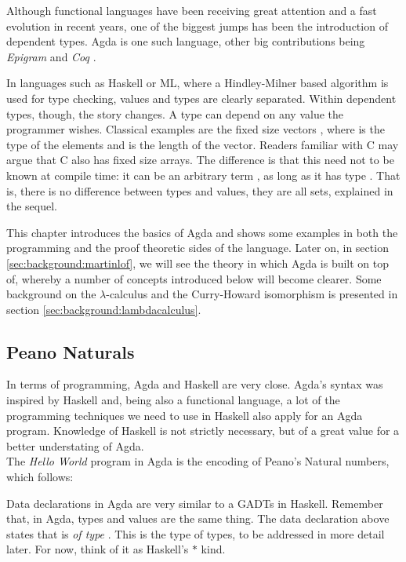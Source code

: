Although functional languages have been receiving great attention
and a fast evolution in recent years, one of the biggest jumps
has been the introduction of dependent types. Agda\cite{norell07} is one such language, other 
big contributions being \emph{Epigram} \cite{mcbride05} and \emph{Coq} \cite{bertot06}. 

In languages such as Haskell or ML, where a Hindley-Milner based algorithm is used
for type checking, values and types are clearly separated. Within dependent
types, though, the story changes. A type can depend on any value the programmer
wishes. Classical examples are the fixed size vectors , where 
is the type of the elements and  is the length of the vector. Readers familiar
with C may argue that C also has fixed size arrays. The difference is that
this  need not to be known at compile time: it can be an arbitrary term , as long as it has type . That is, there is no difference between types and values, they are all sets, explained in the sequel.

This chapter introduces the basics of Agda  and shows some examples in both
the programming and the proof theoretic sides of the language. Later on, in 
section \ref{sec:background:martinlof}, we will see the theory in which Agda is built 
on top of, whereby a number of concepts introduced below will become clearer. 
Some background on the $\lambda$-calculus and the Curry-Howard isomorphism is
presented in section \ref{sec:background:lambdacalculus}.

\subsection{Peano Naturals}

In terms of programming, Agda and Haskell are very close. Agda's syntax was
inspired by Haskell and, being also a functional language, a lot of
the programming techniques we need to use in Haskell also apply for an Agda program.
Knowledge of Haskell is not strictly necessary, but of a great value for a better
understating of Agda.\\

The \emph{Hello World} program in Agda is the encoding of Peano's Natural numbers, which follows:


Data declarations in Agda are very similar to a GADTs\cite{Xi2003} in Haskell. Remember that, in Agda, types and values are the same thing.
The data declaration above states that  is \emph{of type} 
 . This  is the type of types, to be addressed in more detail later. 
For now, think of it as Haskell's $*$ kind.


